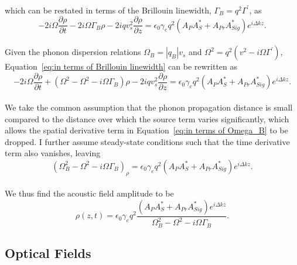 \\
which can be restated in terms of the Brillouin linewidth, \(\Gamma_{B} = q^{2}\Gamma^{\prime}\), as
\\
\begin{equation}
    -2i\Omega\frac{\partial\rho}{\partial t} - 2i\Omega\Gamma_{B}\rho - 2iqv_{s}^{2}\frac{\partial\rho}{\partial z} = \epsilon_{0}\gamma_{e}q^{2}(A_{P}A_{S}^{*} + A_{Pr}A_{Sig}^{*})e^{i\Delta kz}.
    \label{eq:in terms of Brillouin linewidth}
\end{equation}
\\
Given the phonon dispersion relations \(\Omega_{B} = |q_{B}|v_{s}\) and \(\Omega^{2} = q^{2}\left(v^{2} - i\Omega\Gamma^{\prime}\right)\), Equation~\ref{eq:in terms of Brillouin linewidth} can be rewritten as
\\
\begin{equation}
    -2i\Omega\frac{\partial\rho}{\partial t} + \left(\Omega^{2} - \Omega^{2} - i\Omega\Gamma_{B}\right)\rho - 2iqv_{s}^{2}\frac{\partial\rho}{\partial z} = \epsilon_{0}\gamma_{e}q^{2}(A_{P}A_{S}^{*} + A_{Pr}A_{Sig}^{*})e^{i\Delta kz}.
    \label{eq:in terms of Omega_B}
\end{equation}
\\
We take the common assumption that the phonon propagation distance is small compared to the distance over which the source term varies significantly, which allows the spatial derivative term in Equation~\ref{eq:in terms of Omega_B} to be dropped. I further assume steady-state conditions such that the time derivative term also vanishes, leaving
\\
\begin{equation}
    (\Omega^{2}_{B} - \Omega^{2} - i\Omega\Gamma_{B})_{\rho} = \epsilon_{0}\gamma_{e}q^{2}(A_{P}A_{S}^{*} + A_{Pr}A_{Sig}^{*})e^{i\Delta kz}.
\end{equation}
\\
We thus find the acoustic field amplitude to be
\\
\begin{equation}
    \rho(z,t) = \epsilon_{0}\gamma_{e}q^{2}\frac{(A_{P}A_{S}^{*} + A_{Pr}A_{Sig}^{*})e^{i\Delta kz}}{\Omega_{B}^{2} - \Omega^{2} - i\Omega\Gamma_{B}}.
    \label{eq:Acoustic field amplitude}
\end{equation}


\subsection{Optical Fields}
\label{Coupled-Wave Equations:Optical Fields}


